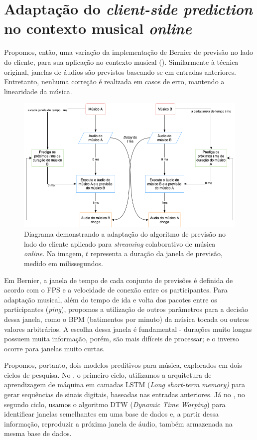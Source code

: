 \section{Adaptação do \textit{client-side prediction} no contexto musical \textit{online}}

Propomos, então, uma variação da implementação de Bernier \cite{client-side-prediction} de previsão no lado do cliente, para sua aplicação no contexto musical (). Similarmente à técnica original, janelas de áudios são previstos baseando-se em entradas anteriores. Entretanto, nenhuma correção é realizada em casos de erro, mantendo a linearidade da música.

\begin{figure}[htbp]
\centering
\includegraphics[width=1\textwidth]{images/rollback-music.png}
\caption{Diagrama demonstrando a adaptação do algoritmo de previsão no lado do cliente aplicado para \textit{streaming} colaborativo de música \textit{online}. Na imagem, $t$ representa a duração da janela de previsão, medido em milissegundos.}
\label{fig:rollback_music_diagram}
\end{figure}

Em Bernier, a janela de tempo de cada conjunto de previsões é definida de acordo com o FPS e a velocidade de conexão entre os participantes. Para adaptação musical, além do tempo de ida e volta dos pacotes entre os participantes (\textit{ping}), propomos a utilização de outros parâmetros para a decisão dessa janela, como o BPM (batimentos por minuto) da música tocada ou outros valores arbitrários. A escolha dessa janela é fundamental - durações muito longas possuem muita informação, porém, são mais difíceis de processar; e o inverso ocorre para janelas muito curtas.

Propomos, portanto, dois modelos preditivos para música, explorados em dois ciclos de pesquisa. No , o primeiro ciclo, utilizamos a arquitetura de aprendizagem de máquina em camadas LSTM (\textit{Long short-term memory)} \cite{lstm} para gerar sequências de sinais digitais, baseadas nas entradas anteriores. Já no , no segundo ciclo, usamos o algoritmo DTW (\textit{Dynamic Time Warping}) \cite{dtw} para identificar janelas semelhantes em uma base de dados e, a partir dessa informação, reproduzir a próxima janela de áudio, também armazenada na mesma base de dados.

